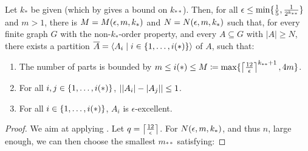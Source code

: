         \begin{theorem} \label{thm:minimal_conditions_for_excellent_partitions}
            Let $k_*$ be given (which by  gives a bound on $k_{**}$).
            Then, for all $\epsilon \leq \min \{ \frac{1}{5}, \frac{1}{2^{k_{**}}} \}$ and $m > 1$, there is $M = M( \epsilon, m, k_* )$
            and $N = N( \epsilon, m, k_* )$ such that, for every finite graph $G$ with the non-$k_{*}$-order property, and
            every $A \subseteq G$ with $|A| \geq N$, there exists a partition $\overline{A} = \left< A_i \mid i \in \{ 1, \dots, i(*) \} \right>$
            of $A$, such that:
            \begin{enumerate}[label={\Roman*}., ref={\Roman*}, font=\rmfamily]
                \item \label{itm:minimal_conditions_for_excellent_partitions.0} The number of parts is bounded by
                    $m \leq i(*) \leq M \coloneqq \max \{ \left\lceil \frac{12}{\epsilon} \right\rceil^{k_{**}+1}, 4m \}$.
                \item \label{itm:minimal_conditions_for_excellent_partitions.1}
                    For all $i, j \in \{ 1, \dots, i(*) \}$, $| | A_i |- | A_j | | \leq 1$.
                \item \label{itm:minimal_conditions_for_excellent_partitions.2}
                    For all $i \in \{ 1, \dots, i(*) \}$, $A_i$ is $\epsilon$-excellent.
            \end{enumerate}
            \begin{proof}
                We aim at applying .
                Let $q = \left\lceil \frac{12}{\epsilon} \right\rceil$.
                For $N( \epsilon, m, k_* )$, and thus $n$, large enough, we can then choose the smallest $m_{**}$ satisfying:
\end{proof}
\end{theorem}

